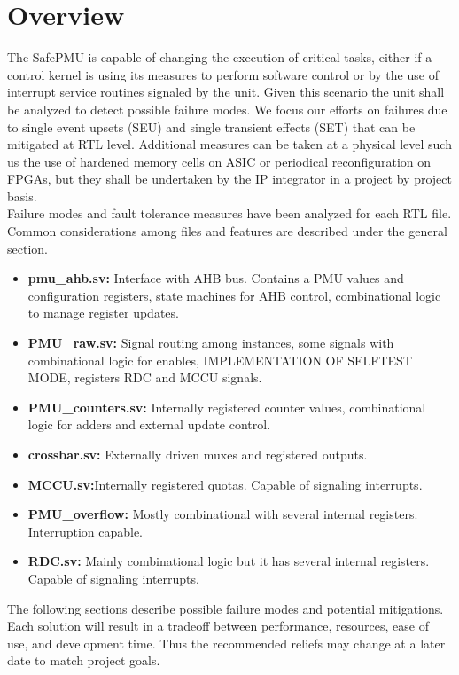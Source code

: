 \newpage
\section{Overview}
\label{chapter1}
The SafePMU is capable of changing the execution of critical tasks, either if a control kernel is using  its measures to perform software control or by the use of interrupt service routines signaled by the unit. Given this scenario the unit shall be analyzed to detect possible failure modes. We focus our efforts on failures due to single event upsets (SEU) and single transient effects (SET) that can be mitigated at RTL level. Additional measures can be taken at a physical level such us the use of hardened memory cells on ASIC or periodical reconfiguration on FPGAs, but they shall be undertaken by the IP integrator in a project by project basis.\\
Failure modes and fault tolerance measures have been analyzed for each RTL file. Common considerations among files and features are described under the general section.\\
\begin{itemize}
	\item \textbf{pmu\_ahb.sv:} Interface with AHB bus. Contains a PMU values and configuration registers, state machines for AHB control, combinational logic to manage register updates.
	\item \textbf{PMU\_raw.sv:} Signal routing among instances, some signals with combinational logic for enables, IMPLEMENTATION OF SELFTEST MODE, registers RDC and MCCU signals.
	\item \textbf{PMU\_counters.sv:} Internally registered counter values, combinational logic for adders and external update control.
	\item \textbf{crossbar.sv:} Externally driven muxes and registered outputs.
	\item \textbf{MCCU.sv:}Internally registered quotas. Capable of signaling interrupts.
	\item \textbf{PMU\_overflow:} Mostly combinational with several internal registers. Interruption capable.
	\item \textbf{RDC.sv:} Mainly combinational logic but it has several internal registers. Capable of signaling interrupts.\\
\end{itemize}
The following sections describe possible failure modes and potential mitigations. Each solution will result in a tradeoff between performance, resources, ease of use, and development time. Thus the recommended reliefs may change at a later date to match project goals.\\